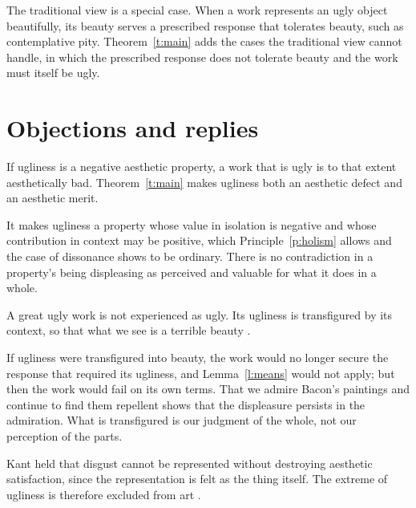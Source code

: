 \documentclass{situationist-preprint}
\begin{document}
The traditional view is a special case. When a work represents an ugly object beautifully, its beauty serves a prescribed response that tolerates beauty, such as contemplative pity. Theorem~\ref{t:main} adds the cases the traditional view cannot handle, in which the prescribed response does not tolerate beauty and the work must itself be ugly.

\section{Objections and replies}

\begin{objection}[Contradiction]\label{o:contra}
If ugliness is a negative aesthetic property, a work that is ugly is to that extent aesthetically bad. Theorem~\ref{t:main} makes ugliness both an aesthetic defect and an aesthetic merit.
\end{objection}

\begin{reply}
It makes ugliness a property whose value in isolation is negative and whose contribution in context may be positive, which Principle~\ref{p:holism} allows and the case of dissonance shows to be ordinary. There is no contradiction in a property's being displeasing as perceived and valuable for what it does in a whole.
\end{reply}

\begin{objection}\label{o:transfig}
A great ugly work is not experienced as ugly. Its ugliness is transfigured by its context, so that what we see is a terrible beauty \citep{Rosenkranz1853}.
\end{objection}

\begin{reply}
If ugliness were transfigured into beauty, the work would no longer secure the response that required its ugliness, and Lemma~\ref{l:means} would not apply; but then the work would fail on its own terms. That we admire Bacon's paintings and continue to find them repellent shows that the displeasure persists in the admiration. What is transfigured is our judgment of the whole, not our perception of the parts.
\end{reply}

\begin{objection}[Disgust]\label{o:disgust}
Kant held that disgust cannot be represented without destroying aesthetic satisfaction, since the representation is felt as the thing itself. The extreme of ugliness is therefore excluded from art \citep[§48]{Kant1790}.
\end{objection}
\end{document}
